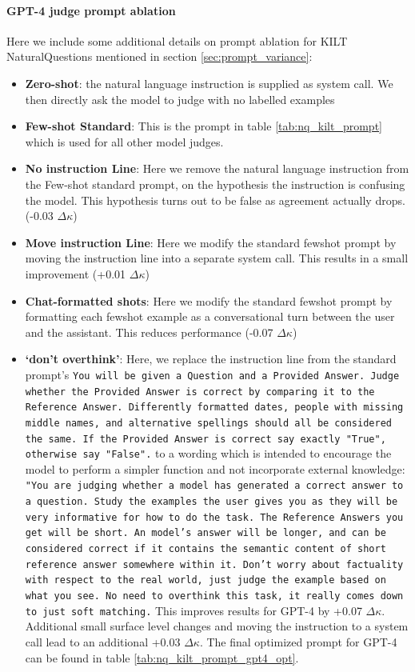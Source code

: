 \documentclass[11pt]{article}
\begin{document}
\paragraph{GPT-4 judge prompt ablation} Here we include some additional details on prompt ablation for KILT NaturalQuestions mentioned in section \ref{sec:prompt_variance}:
\begin{itemize}
    \item \textbf{Zero-shot}: the natural language instruction is supplied as system call. We then directly ask the model to judge with no labelled examples
    \item \textbf{Few-shot Standard}: This is the prompt in table \ref{tab:nq_kilt_prompt} which is used for all other model judges.
    \item \textbf{No instruction Line}: Here we remove the natural language instruction from the Few-shot standard prompt, on the hypothesis the instruction is confusing the model. This hypothesis turns out to be false as agreement actually drops. (-0.03 $\Delta \kappa$)
    \item \textbf{Move instruction Line}: Here we modify the standard fewshot prompt by moving the instruction line into a separate system call. This results in a small improvement (+0.01 $\Delta \kappa$)
    \item \textbf{Chat-formatted shots}: Here we modify the standard fewshot prompt by formatting each fewshot example as a conversational turn between the user and the assistant. This reduces performance (-0.07 $\Delta \kappa$)
    \item \textbf{`don't overthink'}: Here, we replace the instruction line from the standard prompt's \texttt{You will be given a Question and a Provided Answer. Judge whether the Provided Answer is correct by comparing it to the Reference Answer. Differently formatted dates, people with missing middle names, and alternative spellings should all be considered the same. If the Provided Answer is correct say exactly "True", otherwise say "False".} to a wording which is intended to encourage the model to perform a simpler function and not incorporate external knowledge: \texttt{ "You are judging whether a model has generated a correct answer to a question. Study the examples the user gives you as they will be very informative for how to do the task. The Reference Answers you get will be short. An model's answer will be longer, and can be considered correct if it contains the semantic content of short reference answer somewhere within it. Don't worry about factuality with respect to the real world, just judge the example based on what you see. No need to overthink this task, it really comes down to just soft matching.} This improves results for GPT-4 by +0.07 $\Delta \kappa$. Additional small surface level changes and moving the instruction to a system call lead to an additional +0.03 $\Delta \kappa$. The final optimized prompt for GPT-4 can be found in table \ref{tab:nq_kilt_prompt_gpt4_opt}.
\end{itemize}
\end{document}
